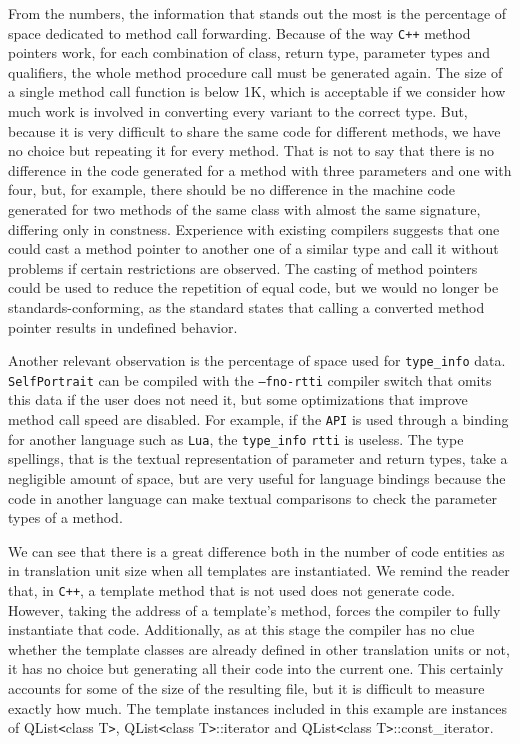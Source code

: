 From the numbers, the information that stands out the most is the percentage of space dedicated to method call forwarding.
Because of the way \texttt{C++} method pointers work, for each combination of class, return type, parameter types and qualifiers, the
whole method procedure call must be generated again. The size of a single method call function is below 1K, which is acceptable
if we consider how much work is involved in converting every variant to the correct type. But, because it is very difficult
to share the same code for different methods, we have no choice but repeating it for every method. That is not to say that
there is no difference in the code generated for a method with three parameters and one with four, but, for example,
there should be no difference in the machine code generated for two methods of the same class with almost the same signature,
differing only in constness. Experience with existing compilers suggests that one could cast a method pointer to another 
one of a similar type \cite{clugston} and call it without problems if certain restrictions are observed. The casting of method pointers could
be used to reduce the repetition of equal code, but we would no longer be standards-conforming, as the standard states that calling
a converted method pointer results in undefined behavior.

Another relevant observation is the percentage of space used for \texttt{type\_info} data. \texttt{SelfPortrait} can be compiled
with the \texttt{--fno-rtti} compiler switch that omits this data if the user does not need it, but some optimizations that improve
method call speed are disabled. For example, if the \texttt{API} is used through a binding for another language such as \texttt{Lua},
the \texttt{type\_info} \texttt{rtti} is useless. The type spellings, that is the textual representation of parameter and return types,
take a negligible amount of space, but are very useful for language bindings because the code in another language can make textual
comparisons to check the parameter types of a method.

We can see that there is a great difference both in the number of code entities as in translation unit size when all templates
are instantiated. We remind the reader that, in \texttt{C++}, a template method that is not used does not generate code. However, taking the
address of a template's method, forces the compiler to fully instantiate that code. Additionally, as at this stage the compiler has no clue
whether the template classes are already defined in other translation units or not, it has no choice but generating all their code
into the current one. This certainly accounts for some of the size of the resulting file, but it is difficult to measure exactly how much.
The template instances included in this example are instances of QList\verb|<|class T\verb|>|, QList\verb|<|class T\verb|>|::iterator and
QList\verb|<|class T\verb|>|::const\_iterator.

